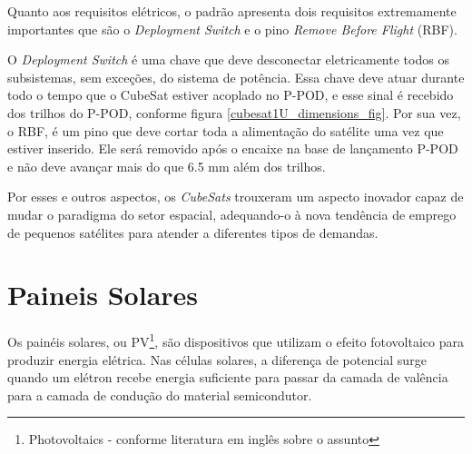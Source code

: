 \noindent
\begin{minipage}{\linewidth}
\label{cubesat1U_dimensions_fig}
\end{minipage}

Quanto aos requisitos elétricos, o padrão apresenta dois requisitos extremamente importantes que são o \textit{Deployment Switch} e o pino \textit{Remove Before Flight} (RBF).

O \textit{Deployment Switch} é uma chave que deve desconectar eletricamente todos os subsistemas, sem exceções, do sistema de potência. Essa chave deve atuar durante todo o tempo que o CubeSat estiver acoplado no P-POD, e esse sinal é recebido dos trilhos do P-POD, conforme figura \ref{cubesat1U_dimensions_fig}.
Por sua vez, o RBF, é um pino que deve cortar toda a alimentação do satélite uma vez que estiver inserido. Ele será removido após o encaixe na base de lançamento P-POD e não deve avançar mais do que 6.5 mm além dos trilhos.

Por esses e outros aspectos, os \textit{CubeSats} trouxeram um aspecto inovador capaz de mudar o paradigma do setor espacial, adequando-o à nova tendência de emprego de pequenos satélites para atender a diferentes tipos de demandas.

\section{Paineis Solares}
Os painéis solares, ou PV\footnote{Photovoltaics - conforme literatura em inglês sobre o assunto}, são dispositivos que utilizam o efeito fotovoltaico para produzir energia elétrica. Nas células solares, a diferença de potencial surge quando um elétron recebe energia suficiente para passar da camada de valência para a camada de condução do material semicondutor.

